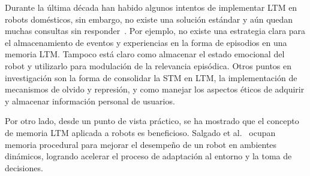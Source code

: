 Durante la última década han habido algunos intentos de implementar LTM en robots domésticos, sin embargo, no existe una solución estándar y aún quedan muchas consultas sin responder~\cite{ltm_in_robocup}. Por ejemplo, no existe una estrategia clara para el almacenamiento de eventos y experiencias en la forma de episodios en una memoria LTM. Tampoco está claro como almacenar el estado emocional del robot y utilizarlo para modulación de la relevancia episódica. Otros puntos en investigación son la forma de consolidar la STM en LTM, la implementación de mecanismos de olvido y represión, y como manejar los aspectos éticos de adquirir y almacenar información personal de usuarios.

Por otro lado, desde un punto de vista práctico, se ha mostrado que el concepto de memoria LTM aplicada a robots es beneficioso. Salgado et al.~\cite{Salgado2012} ocupan memoria procedural para mejorar el desempeño de un robot en ambientes dinámicos, logrando acelerar el proceso de adaptación al entorno y la toma de decisiones.


